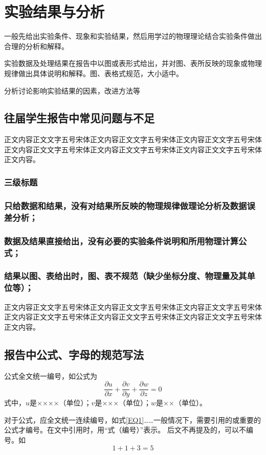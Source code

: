 \documentclass{thuemp}
\begin{document}
\section{实验结果与分析}
一般先给出实验条件、现象和实验结果，然后用学过的物理理论结合实验条件做出合理的分析和解释。

实验数据及处理结果在报告中以图或表形式给出，并对图、表所反映的现象或物理规律做出具体说明和解释。图、表格式规范，大小适中。

分析讨论影响实验结果的因素，改进方法等

\subsection{往届学生报告中常见问题与不足}
正文内容正文文字五号宋体正文内容正文文字五号宋体正文内容正文文字五号宋体正文内容正文文字五号宋体正文内容正文文字五号宋体正文内容正文文字五号宋体正文内容。
\subsubsection{三级标题}
\subsubsection{只给数据和结果，没有对结果所反映的物理规律做理论分析及数据误差分析；}
\subsubsection{数据及结果直接给出，没有必要的实验条件说明和所用物理计算公式；}
\subsubsection{结果以图、表给出时，图、表不规范（缺少坐标分度、物理量及其单位等）；}
正文内容正文文字五号宋体正文内容正文文字五号宋体正文内容正文文字五号宋体正文内容正文文字五号宋体正文内容正文文字五号宋体正文内容正文文字五号宋体正文内容。
\subsection{报告中公式、字母的规范写法}
公式全文统一编号，如公式为
\begin{equation}\label{EQ1}
\frac{\partial u}{\partial x}+\frac{\partial v}{\partial y}+\frac{\partial w}{\partial z}=0
\end{equation}
式中，$u$是××××（单位）；$v$是×××（单位）；$w$是××（单位）。

对于公式，应全文统一连续编号，如式\eqref{EQ1}……一般情况下，需要引用的或重要的公式才编号。在文中引用时，用“式（编号）”表示。
后文不再提及的，可以不编号。如
\begin{equation*}
1 + 1 + 3 = 5
\end{equation*}
\end{document}

